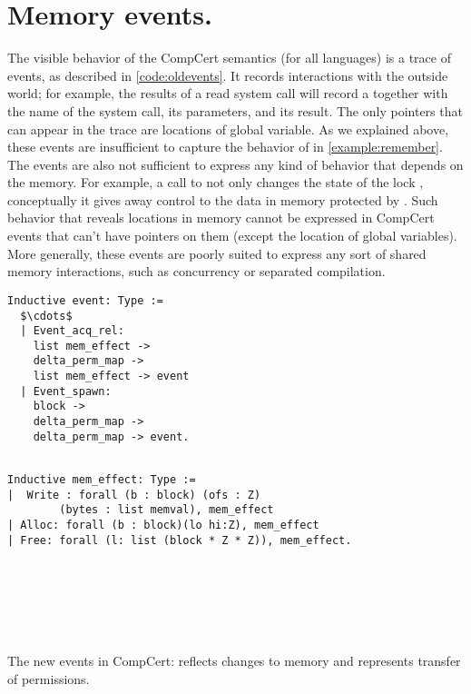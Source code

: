 \section{Memory events.}

The visible behavior of the CompCert semantics (for all languages) is a trace of events, as described in \ref{code:oldevents}. It records interactions with the outside world; for example, the results of a read system call will record a  together with the name of the system call, its parameters, and its result. The only pointers that can appear in the trace are locations of global variable. As we explained above, these events are insufficient to capture the behavior of  in \ref{example:remember}. The events are also not sufficient to express any kind of behavior that depends on the memory. For example, a call to  not only changes the state of the lock , conceptually it gives away control to the data in memory protected by . Such behavior that reveals locations in memory cannot be expressed in CompCert events that can't have pointers on them (except the location of global variables). More generally, these events are poorly suited to express any sort of shared memory interactions, such as concurrency or separated compilation. 
\begin{table}\centering
\begin{multicols}{2}
\begin{lstlisting}
Inductive event: Type :=
  $\cdots$
  | Event_acq_rel: 
  	list mem_effect -> 
	delta_perm_map -> 
	list mem_effect -> event
  | Event_spawn: 
  	block -> 
  	delta_perm_map -> 
  	delta_perm_map -> event.
	
  \end{lstlisting}

	
  \begin{lstlisting}
Inductive mem_effect: Type :=
|  Write : forall (b : block) (ofs : Z)
		(bytes : list memval), mem_effect
| Alloc: forall (b : block)(lo hi:Z), mem_effect
| Free: forall (l: list (block * Z * Z)), mem_effect.
  \end{lstlisting}
  
  \
	
	\
	
	\
	
\end{multicols}
\caption{The new events in CompCert:   reflects changes to memory and  represents transfer of  permissions.}\label{code:newevents}
\end{table}
